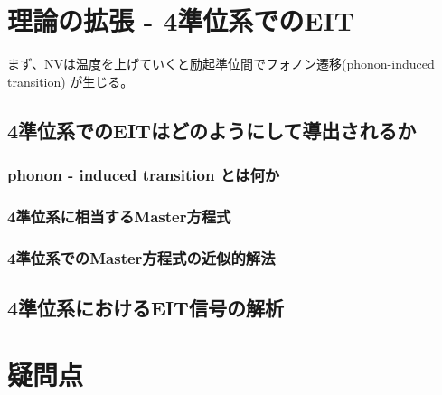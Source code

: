 \documentclass[11pt,a4paper]{ltjsarticle}
\begin{document}















\section{理論の拡張 - 4準位系でのEIT}



まず、NVは温度を上げていくと励起準位間でフォノン遷移(phonon-induced transition) \cite{S. Ernst} が生じる。

\subsection{4準位系でのEITはどのようにして導出されるか}

\subsubsection{phonon - induced transition とは何か}
\subsubsection{4準位系に相当するMaster方程式}
\subsubsection{4準位系でのMaster方程式の近似的解法}

\subsection{4準位系におけるEIT信号の解析}





\section{疑問点}
\end{document}
